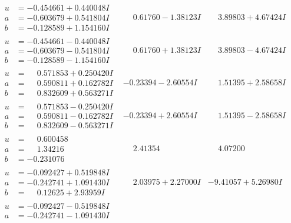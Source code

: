 \documentclass[1p]{elsarticle_modified}
\theoremstyle{definition}
\begin{document}
$$\begin{array}{c|c|c}
\begin{aligned}
u &= -0.454661 + 0.440048 I \\
a &= -0.603679 + 0.541804 I \\
b &= -0.128589 + 1.154160 I\end{aligned}
 & \phantom{-}0.61760 - 1.38123 I & \phantom{-}3.89803 + 4.67424 I \\ \hline\begin{aligned}
u &= -0.454661 - 0.440048 I \\
a &= -0.603679 - 0.541804 I \\
b &= -0.128589 - 1.154160 I\end{aligned}
 & \phantom{-}0.61760 + 1.38123 I & \phantom{-}3.89803 - 4.67424 I \\ \hline\begin{aligned}
u &= \phantom{-}0.571853 + 0.250420 I \\
a &= \phantom{-}0.590811 + 0.162782 I \\
b &= \phantom{-}0.832609 + 0.563271 I\end{aligned}
 & -0.23394 - 2.60554 I & \phantom{-}1.51395 + 2.58658 I \\ \hline\begin{aligned}
u &= \phantom{-}0.571853 - 0.250420 I \\
a &= \phantom{-}0.590811 - 0.162782 I \\
b &= \phantom{-}0.832609 - 0.563271 I\end{aligned}
 & -0.23394 + 2.60554 I & \phantom{-}1.51395 - 2.58658 I \\ \hline\begin{aligned}
u &= \phantom{-}0.600458\phantom{ +0.000000I} \\
a &= \phantom{-}1.34216\phantom{ +0.000000I} \\
b &= -0.231076\phantom{ +0.000000I}\end{aligned}
 & \phantom{-}2.41354\phantom{ +0.000000I} & \phantom{-}4.07200\phantom{ +0.000000I} \\ \hline\begin{aligned}
u &= -0.092427 + 0.519848 I \\
a &= -0.242741 + 1.091430 I \\
b &= \phantom{-}0.12625 + 2.93959 I\end{aligned}
 & \phantom{-}2.03975 + 2.27000 I & -9.41057 + 5.26980 I \\ \hline\begin{aligned}
u &= -0.092427 - 0.519848 I \\
a &= -0.242741 - 1.091430 I \\

\end{aligned}
\end{array}$$
\end{document}
